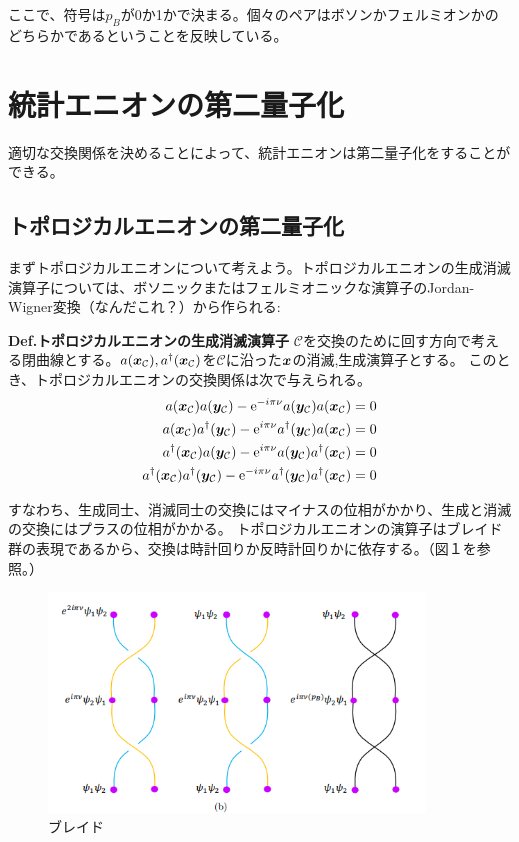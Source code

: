 \documentclass[a4paper,11pt]{jsarticle}
\numberwithin{equation}{section}
\begin{document}
ここで、符号は$p_B$が0か1かで決まる。個々のペアはボソンかフェルミオンかのどちらかであるということを反映している。

\section{統計エニオンの第二量子化}
適切な交換関係を決めることによって、統計エニオンは第二量子化をすることができる。

\subsection{トポロジカルエニオンの第二量子化}
まずトポロジカルエニオンについて考えよう。トポロジカルエニオンの生成消滅演算子については、ボソニックまたはフェルミオニックな演算子のJordan-Wigner変換（なんだこれ？）から作られる:
\\

\begin{itembox}[l]{\textbf{Def.トポロジカルエニオンの生成消滅演算子 }}
$\mathcal{C}$を交換のために回す方向で考える閉曲線とする。$a(\vb*{x}_\mathcal{C}),a^{\dag}(\vb*{x}_\mathcal{C})$を$\mathcal{C}$に沿った$\vb*{x}$の消滅,生成演算子とする。
このとき、トポロジカルエニオンの交換関係は次で与えられる。
\begin{align}
a(\vb*{x}_\mathcal{C})a(\vb*{y}_\mathcal{C})-\mathrm{e}^{-i\pi\nu}a(\vb*{y}_\mathcal{C})a(\vb*{x}_\mathcal{C})=0\\
a(\vb*{x}_\mathcal{C})a^{\dag}(\vb*{y}_\mathcal{C})-\mathrm{e}^{i\pi\nu}a^{\dag}(\vb*{y}_\mathcal{C})a(\vb*{x}_\mathcal{C})=0\\
a^{\dag}(\vb*{x}_\mathcal{C})a(\vb*{y}_\mathcal{C})-\mathrm{e}^{i\pi\nu}a(\vb*{y}_\mathcal{C})a^{\dag}(\vb*{x}_\mathcal{C})=0\\
a^{\dag}(\vb*{x}_\mathcal{C})a^{\dag}(\vb*{y}_\mathcal{C})-\mathrm{e}^{-i\pi\nu}a^{\dag}(\vb*{y}_\mathcal{C})a^{\dag}(\vb*{x}_\mathcal{C})=0
\end{align}
\end{itembox}

すなわち、生成同士、消滅同士の交換にはマイナスの位相がかかり、生成と消滅の交換にはプラスの位相がかかる。
トポロジカルエニオンの演算子はブレイド群の表現であるから、交換は時計回りか反時計回りかに依存する。（図１を参照。）
\begin{figure}[htbp]
\begin{center}
\includegraphics[width=100mm]{anyonwf.png}
\caption{ブレイド}
\end{center}
\end{figure}
\end{document}
